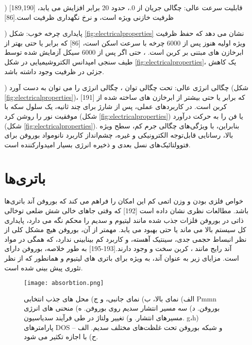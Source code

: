 ) قابلیت سرعت عالی: چگالی جریان از 0.، حدود 20 برابر افزایش می یابد، [189,190] ظرفیت خازنی ویژه  است، و نرخ نگهداری ظرفیت  است.\cite{liScalableProductionFewLayer2018}[86] 

)  پایداری چرخه خوب: شکل \ref{fig:electricalproperties} نشان می دهد که حفظ ظرفیت ویژه اولیه هنوز  پس از 6000 چرخه با سرعت اسکن  است، \cite{liScalableProductionFewLayer2018}[86] که برابر یا حتی بهتر از ابرخازن های مبتنی بر کربن است. ، حتی اگر پس از 6000 سیکل آزمایش شده توسط طیف سنجی امپدانس الکتروشیمیایی در شکل \ref{fig:electricalproperties}، یک کاهش جزئی در ظرفیت وجود داشته باشد. 

) چگالی انرژی عالی: تحت چگالی توان ، چگالی انرژی  را می توان به دست آورد (شکل \ref{fig:electricalproperties})،\cite{shaoHighperformanceFlexibleAsymmetric2013} [191] که برابر یا حتی بیشتر از ابرخازن های ساخته شده از کربن است. در کاربردهای عملی، پس از شارژ برای چند ثانیه، یک سلول سکه با موفقیت نور را روشن کرد (شکل \ref{fig:electricalproperties}) یا فن را به حرکت درآورد (شکل \ref{fig:electricalproperties}). بنابراین، با ویژگی‌های چگالی جرم کم، سطح ویژه بالا، رسانایی قابل‌توجه الکترونیکی و غیره، چشم‌انداز کاربرد نانومواد بوروفن برای فتوولتائیک‌های نسل بعدی و ذخیره انرژی بسیار امیدوارکننده است.

\section{باتری‌ها}
خواص فلزی بودن و وزن اتمی کم این امکان را فراهم می کند که بوروفن آند باتری‌ها باشد. مطالعات نظری نشان داده است \cite{atacaHydrogenStorageCalcium2009}[192] که وقتی جاهای خالی شش ضلعی توخالی ذاتی در بوروفن فلزات جذب شده مانند لیتیوم و سدیم را محکم نگه می دارد، پایداری کل سیستم بالا می ماند یا حتی بهبود می یابد. مهمتر از آن، بوروفن هیچ مشکل کلی از نظر انبساط حجمی جدی، سینتیک آهسته، و کاربرد کم بینابینی ندارد، که همگی در مواد آند رایج مانند ، کربن سخت و  وجود دارند.\cite{ponrouchHighCapacityHard2013, alcantaraNiCo2O4SpinelFirst2002, liuUltrasmallSnNanoparticles2015}[193-195] به طور خلاصه، بوروفن دارای است. مزایای زیر به عنوان آند، به ویژه برای باتری های لیتیوم و  همانطور که از نظر تئوری پیش بینی شده است.
\begin{figure*}
    \centering
    \texttt{[image: absorbtion.png]}
    \caption{الف) نمای بالا، ب) نمای جانبی، و ج) محل های جذب انتخابی Pmmn بوروفن. د) سه مسیر انتشار سدیم روی بوروفن. ه) منحنی های انرژی مسیرهای انتشار. و) تغییر ولتاژ در طی فرآیند سدیاسیون. g،h) پارامترهای DOS و شبکه بوروفن تحت غلظت‌های مختلف سدیم. الف – ح) با اجازه تکثیر می شود.}
    \label{fig:absorbtion}
\end{figure*}
